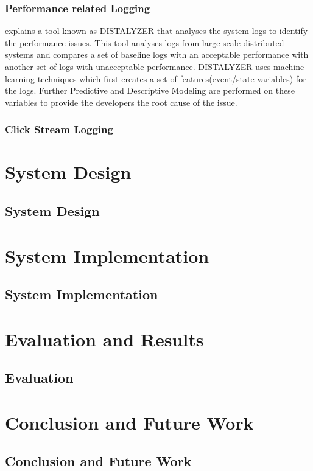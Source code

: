 \documentclass[article,type=msc,colorback,12pt,accentcolor=tud7b]{tudthesis}
\begin{document}
		\subsubsection{Performance related Logging}
		\cite{nagaraj2012structured} explains a tool known as DISTALYZER that analyses the system logs to identify the performance issues. This tool analyses logs from large scale distributed systems and compares a set of baseline logs with an acceptable performance with another set of logs with unacceptable performance. DISTALYZER uses machine learning techniques which first creates a set of features(event/state variables) for the logs. Further Predictive and Descriptive Modeling are performed on these variables to provide the developers the root cause of the issue.
		
		
		
		\subsubsection{Click Stream Logging}
	
	
	
 \cleardoublepage
 \section{System Design}	
 \subsection{System Design}

 \cleardoublepage
 \section{System Implementation}
 \subsection{System Implementation}

 \cleardoublepage	  
 \section{Evaluation and Results}	  
 \subsection{Evaluation}
 
 \cleardoublepage
 \section{Conclusion and Future Work}	  
 \subsection{Conclusion and Future Work}

\clearpage
	  

	  
\end{document}
